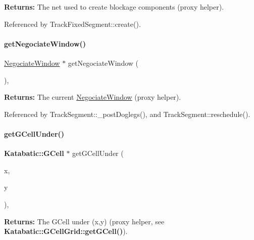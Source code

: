 {\bfseries Returns\+:} The net used to create blockage components (proxy helper). 

Referenced by Track\+Fixed\+Segment\+::create().

\mbox{\label{classKite_1_1Session_a39ebff178f2e0abb9d5a29f485e0bbab}} 
\paragraph{\texorpdfstring{get\+Negociate\+Window()}{getNegociateWindow()}}
{\footnotesize\ttfamily \hyperlink{classKite_1_1NegociateWindow}{Negociate\+Window} $\ast$ get\+Negociate\+Window (\begin{DoxyParamCaption}{ }\end{DoxyParamCaption})\hspace{0.3cm}{\ttfamily [inline]}, {\ttfamily [static]}}

{\bfseries Returns\+:} The current \hyperlink{classKite_1_1NegociateWindow}{Negociate\+Window} (proxy helper). 

Referenced by Track\+Segment\+::\+\_\+post\+Doglegs(), and Track\+Segment\+::reschedule().

\mbox{\label{classKite_1_1Session_a27ecb1cf5ffabe1c7901c5c894a5067d}} 
\paragraph{\texorpdfstring{get\+G\+Cell\+Under()}{getGCellUnder()}}
{\footnotesize\ttfamily \textbf{ Katabatic\+::\+G\+Cell} $\ast$ get\+G\+Cell\+Under (\begin{DoxyParamCaption}\item[{\textbf{ Db\+U\+::\+Unit}}]{x,  }\item[{\textbf{ Db\+U\+::\+Unit}}]{y }\end{DoxyParamCaption})\hspace{0.3cm}{\ttfamily [inline]}, {\ttfamily [static]}}

{\bfseries Returns\+:} The G\+Cell under {\ttfamily }(x,y) (proxy helper, see \textbf{ Katabatic\+::\+G\+Cell\+Grid\+::get\+G\+Cell()}). 

